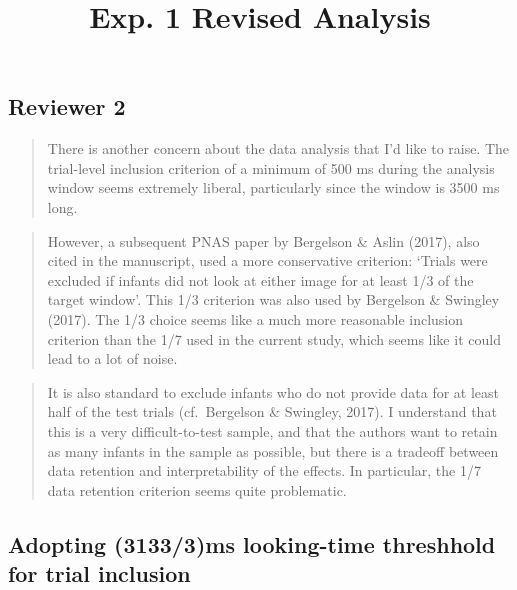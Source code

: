 \documentclass[
  doc,floatsintext]{apa6}
\title{Exp. 1 Revised Analysis}
\author{\phantom{0}}
\date{}
\affiliation{\phantom{0}}
\begin{document}
\maketitle

\subsection{Reviewer 2}\label{reviewer-2}

\begin{quote}
There is another concern about the data analysis that I'd like to raise. The trial-level inclusion criterion of a minimum of 500 ms during the analysis window seems extremely liberal, particularly since the window is 3500 ms long.
\end{quote}

\begin{quote}
However, a subsequent PNAS paper by Bergelson \& Aslin (2017), also cited in the manuscript, used a more conservative criterion: `Trials were excluded if infants did not look at either image for at least 1/3 of the target window'. This 1/3 criterion was also used by Bergelson \& Swingley (2017). The 1/3 choice seems like a much more reasonable inclusion criterion than the 1/7 used in the current study, which seems like it could lead to a lot of noise.
\end{quote}

\begin{quote}
It is also standard to exclude infants who do not provide data for at least half of the test trials (cf.~Bergelson \& Swingley, 2017). I understand that this is a very difficult-to-test sample, and that the authors want to retain as many infants in the sample as possible, but there is a tradeoff between data retention and interpretability of the effects. In particular, the 1/7 data retention criterion seems quite problematic.
\end{quote}

\subsection{Adopting (3133/3)ms looking-time threshhold for trial inclusion}\label{adopting-31333ms-looking-time-threshhold-for-trial-inclusion}
\end{document}
